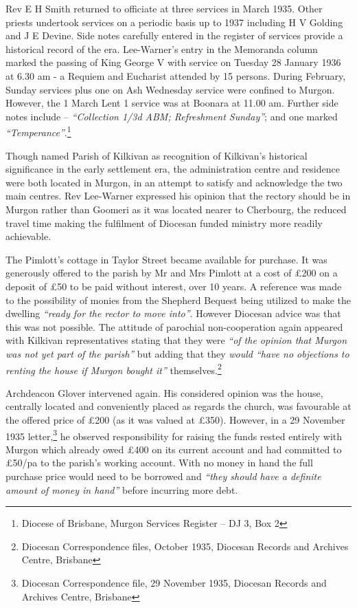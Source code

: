 Rev E H Smith returned to officiate at three services in March 1935. Other priests undertook services on a periodic basis up to 1937 including H V Golding and J E Devine. Side notes carefully entered in the register of services provide a historical record of the era. Lee-Warner's entry in the Memoranda column marked the passing of King George V with service on Tuesday 28 January 1936 at 6.30 am - a Requiem and Eucharist attended by 15 persons. During February, Sunday services plus one on Ash Wednesday service were confined to Murgon. However, the 1 March Lent 1 service was at Boonara at 11.00 am. Further side notes include -- \emph{``Collection 1/3d ABM; Refreshment Sunday''}; and one marked \emph{``Temperance''}.\footnote{Diocese of Brisbane, Murgon Services Register -- DJ 3, Box 2}


Though named Parish of Kilkivan as recognition of Kilkivan's historical significance in the early settlement era, the administration centre and residence were both located in Murgon, in an attempt to satisfy and acknowledge the two main centres. Rev Lee-Warner expressed his opinion that the rectory should be in Murgon rather than Goomeri as it was located nearer to Cherbourg, the reduced travel time making the fulfilment of Diocesan funded ministry more readily achievable.



The Pimlott's cottage in Taylor Street became available for purchase. It was generously offered to the parish by Mr and Mrs Pimlott at a cost of \pounds200 on a deposit of \pounds50 to be paid without interest, over 10 years. A reference was made to the possibility of monies from the Shepherd Bequest being utilized to make the dwelling \emph{``ready for the rector to move into''}. However Diocesan advice was that this was not possible. The attitude of parochial non-cooperation again appeared with Kilkivan representatives stating that they were \emph{``of the opinion that Murgon was not yet part of the parish''} but adding that they \emph{would ``have no objections to renting the house if Murgon bought it''} themselves.\footnote{Diocesan Correspondence files, October 1935, Diocesan Records and Archives Centre, Brisbane}


Archdeacon Glover intervened again. His considered opinion was the house, centrally located and conveniently placed as regards the church, was favourable at the offered price of \pounds200 (as it was valued at \pounds350). However, in a 29 November 1935 letter,\footnote{Diocesan Correspondence file, 29 November 1935, Diocesan Records and Archives Centre, Brisbane} he observed responsibility for raising the funds rested entirely with Murgon which already owed \pounds400 on its current account and had committed to \pounds50/pa to the parish's working account. With no money in hand the full purchase price would need to be borrowed and \emph{``they should have a definite amount of money in hand''} before incurring more debt.


